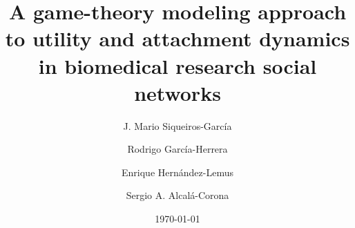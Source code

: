 \documentclass[11pt]{article}
\begin{document}
\title{A game-theory modeling approach to utility
  and attachment dynamics in biomedical research social networks}





\author{J. Mario Siqueiros-Garc\'ia         \and      Rodrigo Garc\'ia-Herrera \and         Enrique Hern\'andez-Lemus \and
        Sergio A. Alcal\'a-Corona  %
}



\date{\today}


\maketitle
\end{document}
